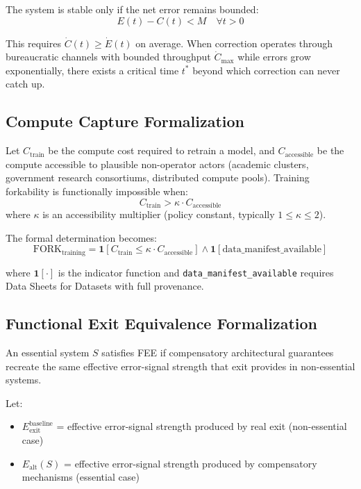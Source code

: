 \documentclass{article}
\begin{document}
The system is stable only if the net error remains bounded:
\begin{equation}
E(t) - C(t) < M \quad \forall t > 0
\end{equation}

This requires $\dot{C}(t) \geq \dot{E}(t)$ on average. When correction operates through bureaucratic channels with bounded throughput $\dot{C}_{\max}$ while errors grow exponentially, there exists a critical time $t^*$ beyond which correction can never catch up.

\subsection{Compute Capture Formalization}

Let $C_{\text{train}}$ be the compute cost required to retrain a model, and $C_{\text{accessible}}$ be the compute accessible to plausible non-operator actors (academic clusters, government research consortiums, distributed compute pools). Training forkability is functionally impossible when:
\begin{equation}
C_{\text{train}} > \kappa \cdot C_{\text{accessible}}
\label{eq:compute-capture}
\end{equation}
where $\kappa$ is an accessibility multiplier (policy constant, typically $1 \leq \kappa \leq 2$).

The formal determination becomes:
\begin{equation}
\text{FORK}_{\text{training}} = \mathbf{1}[C_{\text{train}} \leq \kappa \cdot C_{\text{accessible}}] \land \mathbf{1}[\text{data\_manifest\_available}]
\label{eq:fork-training}
\end{equation}

where $\mathbf{1}[\cdot]$ is the indicator function and \texttt{data\_manifest\_available} requires Data Sheets for Datasets with full provenance.

\subsection{Functional Exit Equivalence Formalization}

An essential system $S$ satisfies FEE if compensatory architectural guarantees recreate the same effective error-signal strength that exit provides in non-essential systems.

Let:
\begin{itemize}[noitemsep]
    \item $E_{\text{exit}}^{\text{baseline}}$ = effective error-signal strength produced by real exit (non-essential case)
    \item $E_{\text{alt}}(S)$ = effective error-signal strength produced by compensatory mechanisms (essential case)
\end{itemize}
\end{document}
